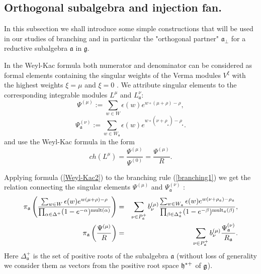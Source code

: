 \documentclass[12pt]{iopart}
\theoremstyle{definition}
\newcommand{\gf}{\mathfrak{g}}
\newcommand{\af}{\mathfrak{a}}
\newcommand{\afb}{\mathfrak{a}_{\bot}}
\begin{document}
\subsection{Orthogonal subalgebra and injection fan.}
\label{subsec:branching-orthog-pair}

In this subsection we shall introduce some simple constructions that will be used
in our studies of branching and in particular the "orthogonal partner" $\afb$ for a
reductive subalgebra $\af$  in  $\gf$.

In the Weyl-Kac formula both numerator and denominator  can be considered
as formal elements containing the singular weights of the Verma modules $V^{\xi}$
with the highest weights $\xi=\mu$ and $\xi=0$ \cite{humphreys1997introduction}.
We attribute singular elements to the corresponding integrable modules $L^{\mu }$
and $L_{\af}^{\nu }$:
\begin{equation*}
\Psi ^{\left( \mu \right) }:=\sum\limits_{w\in W}\epsilon (w)e^{w\circ (\mu +\rho )-\rho },
\end{equation*}
\begin{equation*}
\Psi _{ \af}^{\left( \nu \right) }:=
\sum\limits_{w\in W_{\af}}\epsilon (w)e^{w\circ (\nu +\rho
_{_{\af}})-\rho _{_{\af}}}.
\end{equation*}
and use the Weyl-Kac formula in the form
\begin{equation}
\label{Weyl-Kac2}
ch\left( L^{\mu }\right) =\frac{\Psi ^{\left( \mu \right) }}
{\Psi ^{\left( 0 \right) }}=\frac{\Psi ^{\left( \mu \right) }}{R}.
\end{equation}

Applying formula (\ref{Weyl-Kac2}) to the branching rule (\ref{branching1})
we get the relation connecting the
singular elements $\Psi ^{\left( \mu \right) }$ and $\Psi _{ \af}^{\left( \nu \right) }$ :
\begin{eqnarray}
\nonumber
\pi _{\af}\left( \frac{\sum_{w \in W}\epsilon (w )e^{w
(\mu +\rho )-\rho }}{\prod_{\alpha \in \Delta ^{+}}(1-e^{-\alpha })^{\mathrm{%
mult}(\alpha )}}\right) &=&\sum_{\nu \in P_{\af}^{+}}b_{\nu }^{(\mu )}%
\frac{\sum_{w \in W_{\af}}\epsilon (w )e^{w (\nu +\rho _{%
\af})-\rho _{\af}}}{\prod_{\beta \in \Delta _{\af%
}^{+}}(1-e^{-\beta })^{\mathrm{mult}_{\af}(\beta )}},  \label{eq:4} \\
\pi _{\af}\left( \frac{\Psi ^{\left( \mu \right) }}{R}\right)
&=&\sum_{\nu \in P_{\af}^{+}}b_{\nu }^{(\mu )}\frac{\Psi _{ \frak{%
a}}^{\left( \nu \right) }}{R_{\af}}.
\end{eqnarray}
Here $\Delta _{\af}^{+}$ is the set of
positive roots of the subalgebra $\af$ (without loss of generality we consider
them as vectors from the positive root space $\frak{h}^{\ast  +}$ of $\frak{g}$).
\end{document}
